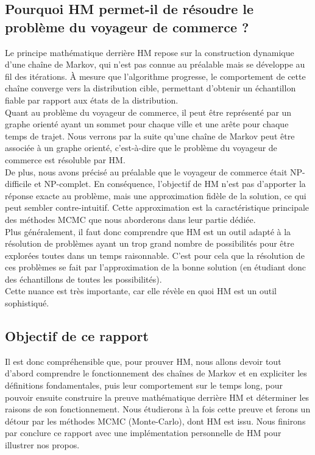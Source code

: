 \documentclass{article}
\begin{document}
\subsection{Pourquoi HM permet-il de résoudre le problème du voyageur de commerce ?}

Le principe mathématique derrière HM repose sur la construction dynamique d'une chaîne de Markov, qui n'est pas connue au préalable mais se développe au fil des itérations. À mesure que l'algorithme progresse, le comportement de cette chaîne converge vers la distribution cible, permettant d'obtenir un échantillon fiable par rapport aux états de la distribution. \\
Quant au problème du voyageur de commerce, il peut être représenté par un graphe orienté ayant un sommet pour chaque ville et une arête pour chaque temps de trajet. Nous verrons par la suite qu'une chaîne de Markov peut être associée à un graphe orienté, c'est-à-dire que le problème du voyageur de commerce est résoluble par HM. \\

De plus, nous avons précisé au préalable que le voyageur de commerce était NP-difficile et NP-complet. En conséquence, l'objectif de HM n'est pas d'apporter la réponse exacte au problème, mais une approximation fidèle de la solution, ce qui peut sembler contre-intuitif. Cette approximation est la caractéristique principale des méthodes MCMC que nous aborderons dans leur partie dédiée. \\
Plus généralement, il faut donc comprendre que HM est un outil adapté à la résolution de problèmes ayant un trop grand nombre de possibilités pour être explorées toutes dans un temps raisonnable. C'est pour cela que la résolution de ces problèmes se fait par l'approximation de la bonne solution (en étudiant donc des échantillons de toutes les possibilités). \\
Cette nuance est très importante, car elle révèle en quoi HM est un outil sophistiqué. \\ 

\subsection{Objectif de ce rapport}

Il est donc compréhensible que, pour prouver HM, nous allons devoir tout d'abord comprendre le fonctionnement des chaînes de Markov et en expliciter les définitions fondamentales, puis leur comportement sur le temps long, pour pouvoir ensuite construire la preuve mathématique derrière HM et déterminer les raisons de son fonctionnement. Nous étudierons à la fois cette preuve et ferons un détour par les méthodes MCMC (Monte-Carlo), dont HM est issu. Nous finirons par conclure ce rapport avec une implémentation personnelle de HM pour illustrer nos propos.
\end{document}
